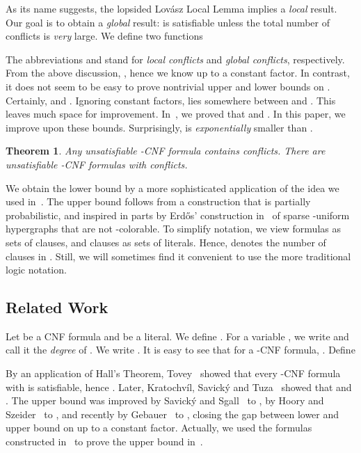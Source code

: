\documentclass[a4paper, 11pt]{article}
\newtheorem{theorem}{Theorem}\newtheorem{proposition}[theorem]{Proposition}
\begin{document}
As its name suggests, the lopsided Lov\'asz Local Lemma implies a {\em
local} result.
Our goal is to obtain a {\em global} result:  is satisfiable unless the total number of
conflicts is {\em very} large. We define two functions

The abbreviations  and  stand for {\em local conflicts} and
{\em global conflicts}, respectively. From the above discussion,
, hence we know  up to a
constant factor. In contrast, it does not seem to be easy to prove
nontrivial upper and lower bounds on .  Certainly,  and .  Ignoring constant factors,  lies somewhere
between  and .  This leaves much space for improvement.
In~\cite{SZ2008}, we proved that  and . In this paper, we improve upon these
bounds.  Surprisingly,  is \emph{exponentially} smaller than
.

\begin{theorem}
  Any unsatisfiable -CNF formula contains
   conflicts. There are unsatisfiable
  -CNF formulas with  conflicts.
\label{main}
\end{theorem}

We obtain the lower bound by a more sophisticated application of the
idea we used in~\cite{SZ2008}. The upper bound follows from a
construction that is partially probabilistic, and inspired in parts by
Erd\H{o}s' construction in~\cite{Erdos1964} of sparse -uniform
hypergraphs that are not -colorable. To simplify notation, we view
formulas as sets of clauses, and clauses as sets of literals. Hence,
 denotes the number of clauses in . Still, we will sometimes
find it convenient to use the more traditional logic notation.

\subsection*{Related Work}

Let  be a CNF formula and  be a literal. We define . For a variable , we write  and call it the {\em degree} of .
We write . It is easy to see
that for a -CNF formula, . Define
 
By an
application of Hall's Theorem, Tovey~\cite{Tovey1984} showed that every
-CNF formula  with  is satisfiable, hence . Later, Kratochv\'il, Savick\'y and Tuza~\cite{KST1993} showed
that  and
. The upper bound was improved by
Savick\'{y} and Sgall~\cite{SS2000} to , by
Hoory and Szeider~\cite{HS2006} to , and recently by
Gebauer~\cite{Gebauer2009} to ,
closing the gap between lower and upper bound on  up to a
constant factor. Actually, we used the formulas constructed in~\cite{HS2006}
to prove the upper bound  in~\cite{SZ2008}.\\
\end{document}
